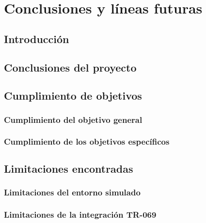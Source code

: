 %
%

\chapter{Conclusiones y líneas futuras}
\label{cha:conclusiones-lineas-futuras}

\section{Introducción}
\label{sec:introduccion-conclusiones-lineas-futuras}


\section{Conclusiones del proyecto}
\label{sec:conclusiones-proyecto}


\section{Cumplimiento de objetivos}
\label{sec:cumplimiento-objetivos}

\subsection{Cumplimiento del objetivo general}
\label{subsec:cumplimiento-objetivo-general}

\subsection{Cumplimiento de los objetivos específicos}
\label{subsec:cumplimiento-objetivos-especificos}


\section{Limitaciones encontradas}
\label{sec:limitaciones-encontradas}

\subsection{Limitaciones del entorno simulado}
\label{subsec:limitaciones-entorno-simulado}

\subsection{Limitaciones de la integración TR-069}
\label{subsec:limitaciones-integracion-tr069}

